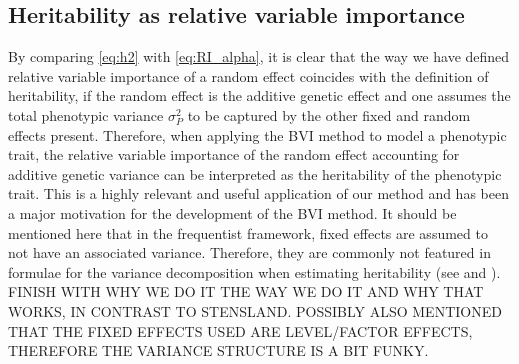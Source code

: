 \subsection{Heritability as relative variable importance}
By comparing \eqref{eq:h2} with \eqref{eq:RI_alpha}, it is clear that the way we have defined relative variable importance of a random effect coincides with the definition of heritability, if the random effect is the additive genetic effect and one assumes the total phenotypic variance $\sigma^2_P$ to be captured by the other fixed and random effects present. Therefore, when applying the BVI method to model a phenotypic trait, the relative variable importance of the random effect accounting for additive genetic variance can be interpreted as the heritability of the phenotypic trait. This is a highly relevant and useful application of our method and has been a major motivation for the development of the BVI method. It should be mentioned here that in the frequentist framework, fixed effects are assumed to not have an associated variance. Therefore, they are commonly not featured in formulae for the variance decomposition when estimating heritability (see \citet{Kruuk2004} and \citet{Wilson_guide_animal_model}). FINISH WITH WHY WE DO IT THE WAY WE DO IT AND WHY THAT WORKS, IN CONTRAST TO STENSLAND. POSSIBLY ALSO MENTIONED THAT THE FIXED EFFECTS USED ARE LEVEL/FACTOR EFFECTS, THEREFORE THE VARIANCE STRUCTURE IS A BIT FUNKY.


